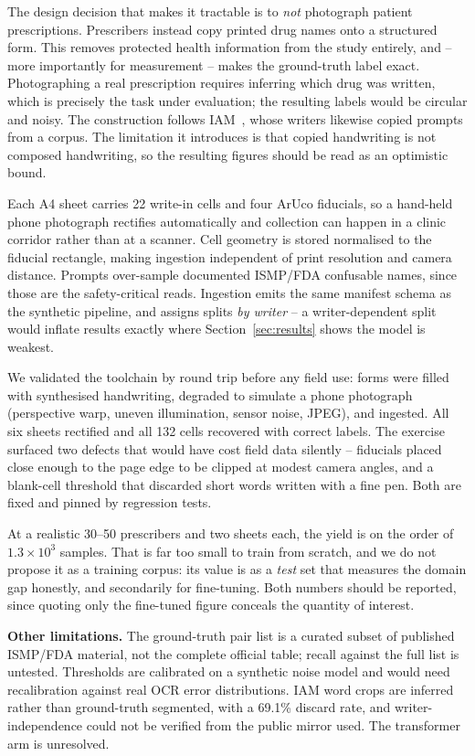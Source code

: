 \documentclass[conference]{IEEEtran}
\begin{document}
The design decision that makes it tractable is to \emph{not} photograph patient
prescriptions. Prescribers instead copy printed drug names onto a structured
form. This removes protected health information from the study entirely, and --
more importantly for measurement -- makes the ground-truth label exact.
Photographing a real prescription requires inferring which drug was written,
which is precisely the task under evaluation; the resulting labels would be
circular and noisy. The construction follows IAM~\cite{marti2002iam}, whose
writers likewise copied prompts from a corpus. The limitation it introduces is
that copied handwriting is not composed handwriting, so the resulting figures
should be read as an optimistic bound.

Each A4 sheet carries 22 write-in cells and four ArUco fiducials, so a
hand-held phone photograph rectifies automatically and collection can happen in
a clinic corridor rather than at a scanner. Cell geometry is stored normalised
to the fiducial rectangle, making ingestion independent of print resolution and
camera distance. Prompts over-sample documented ISMP/FDA confusable names, since
those are the safety-critical reads. Ingestion emits the same manifest schema as
the synthetic pipeline, and assigns splits \emph{by writer} -- a
writer-dependent split would inflate results exactly where
Section~\ref{sec:results} shows the model is weakest.

We validated the toolchain by round trip before any field use: forms were
filled with synthesised handwriting, degraded to simulate a phone photograph
(perspective warp, uneven illumination, sensor noise, JPEG), and ingested. All
six sheets rectified and all 132 cells recovered with correct labels. The
exercise surfaced two defects that would have cost field data silently --
fiducials placed close enough to the page edge to be clipped at modest camera
angles, and a blank-cell threshold that discarded short words written with a
fine pen. Both are fixed and pinned by regression tests.

At a realistic 30--50 prescribers and two sheets each, the yield is on the order
of $1.3\times10^{3}$ samples. That is far too small to train from scratch, and
we do not propose it as a training corpus: its value is as a \emph{test} set
that measures the domain gap honestly, and secondarily for fine-tuning. Both
numbers should be reported, since quoting only the fine-tuned figure conceals
the quantity of interest.

\textbf{Other limitations.} The ground-truth pair list is a curated subset of
published ISMP/FDA material, not the complete official table; recall against the
full list is untested. Thresholds are calibrated on a synthetic noise model and
would need recalibration against real OCR error distributions. IAM word crops
are inferred rather than ground-truth segmented, with a 69.1\% discard rate, and
writer-independence could not be verified from the public mirror used. The
transformer arm is unresolved.
\end{document}
